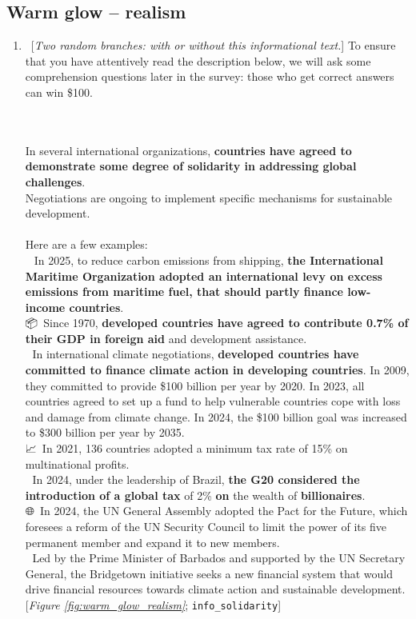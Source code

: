  \subsection*{Warm glow -- realism} 
 \begin{enumerate}[resume] 
\item ~[\textit{Two random branches: with or without this informational text.}] \label{q:info_solidarity} To ensure that you have attentively read the description below, we will ask some comprehension questions later in the survey: those who get correct answers can win \$100.

~\\\\In several international organizations, \textbf{countries have agreed to demonstrate some degree of solidarity in addressing global challenges}.\\
Negotiations are ongoing to implement specific mechanisms for sustainable development.\\\\Here are a few examples:\\🚢~In 2025, to reduce carbon emissions from shipping, \textbf{the International Maritime Organization adopted an international levy on excess emissions from maritime fuel, that should partly finance low-income countries}.\\📦~Since 1970, \textbf{developed countries have agreed to contribute 0.7\% of their GDP in foreign aid} and development assistance.\\
🌱 In international climate negotiations, \textbf{developed countries have committed to finance climate action in developing countries}. In 2009, they committed to provide \$100 billion per year by 2020. In 2023, all countries agreed to set up a fund to help vulnerable countries cope with loss and damage from climate change. In 2024, the \$100 billion goal was increased to \$300 billion per year by 2035.\\📈~In 2021, 136 countries adopted a minimum tax rate of 15\% on multinational profits.\\💎 In 2024, under the leadership of Brazil, \textbf{the G20 considered the introduction of a global tax} of 2\% \textbf{on }the wealth of \textbf{billionaires}.
~\\🌐~In 2024, the UN General Assembly adopted the Pact for the Future, which foresees a reform of the UN Security Council to limit the power of its five permanent member and expand it to new members.\\🔄 Led by the Prime Minister of Barbados and supported by the UN Secretary General, the Bridgetown initiative seeks a new financial system that would drive financial resources towards climate action and sustainable development. [\textit{Figure \ref{fig:warm_glow_realism}}; 
\verb|info_solidarity|]



\end{enumerate}
